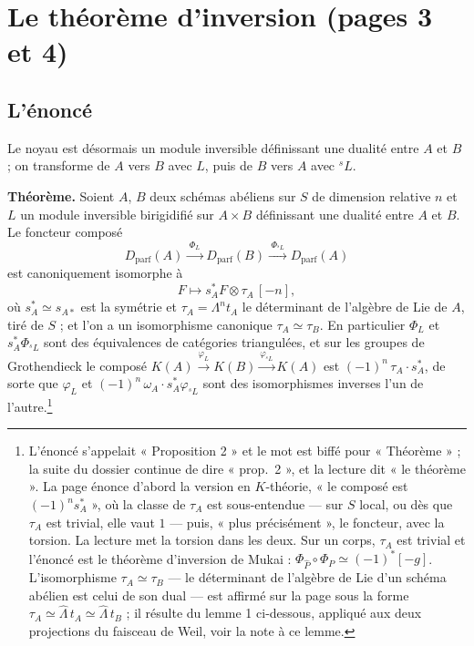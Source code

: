 \documentclass[11pt,a4paper]{article}
\begin{document}
\section*{Le théorème d'inversion (pages 3 et 4)}

\subsection*{L'énoncé}

Le noyau est désormais un module inversible définissant une dualité entre
$A$ et $B$ ; on transforme de $A$ vers $B$ avec $L$, puis de $B$ vers $A$
avec ${}^{s}L$.

\textbf{Théorème.} Soient $A$, $B$ deux schémas abéliens sur $S$ de
dimension relative $n$ et $L$ un module inversible birigidifié sur
$A \times B$ définissant une dualité entre $A$ et $B$. Le foncteur composé
\[
  D_{\mathrm{parf}}(A) \xrightarrow{\;\Phi_L\;} D_{\mathrm{parf}}(B)
  \xrightarrow{\;\Phi_{{}^{s}L}\;} D_{\mathrm{parf}}(A)
\]
est canoniquement isomorphe à
\[
  F \longmapsto s_A^{*}F \otimes \tau_A\,[-n],
\]
où $s_A^{*} \simeq s_{A*}$ est la symétrie et $\tau_A = \Lambda^{n}t_A$ le
déterminant de l'algèbre de Lie de $A$, tiré de $S$ ; et l'on a un
isomorphisme canonique $\tau_A \simeq \tau_B$. En particulier $\Phi_L$ et
$s_A^{*}\Phi_{{}^{s}L}$ sont des équivalences de catégories triangulées, et
sur les groupes de Grothendieck le composé
$K(A) \xrightarrow{\varphi_L} K(B) \xrightarrow{\varphi_{{}^{s}L}} K(A)$
est $(-1)^n\, \tau_A \cdot s_A^{*}$, de sorte que $\varphi_L$ et
$(-1)^n\,\omega_A \cdot s_A^{*}\varphi_{{}^{s}L}$ sont des isomorphismes
inverses l'un de l'autre.\footnote{L'énoncé s'appelait « Proposition 2 » et le
mot est biffé pour « Théorème » ; la suite du dossier continue de dire
« prop.\ 2 », et la lecture dit « le théorème ». La page énonce d'abord la
version en $K$-théorie, « le composé est $(-1)^n s_A^{*}$ », où la classe de
$\tau_A$ est sous-entendue — sur $S$ local, ou dès que $\tau_A$ est trivial,
elle vaut $1$ — puis, « plus précisément », le foncteur, avec la torsion. La
lecture met la torsion dans les deux. Sur un corps, $\tau_A$ est trivial et
l'énoncé est le théorème d'inversion de Mukai : $\Phi_{\hat P} \circ \Phi_P
\simeq (-1)^{*}[-g]$. L'isomorphisme $\tau_A \simeq \tau_B$ — le
déterminant de l'algèbre de Lie d'un schéma abélien est celui de son dual —
est affirmé sur la page sous la forme $\tau_A \simeq \hat\Lambda\, t_A
\simeq \hat\Lambda\, t_B$ ; il résulte du lemme 1 ci-dessous, appliqué aux
deux projections du faisceau de Weil, voir la note à ce lemme.}
\end{document}
